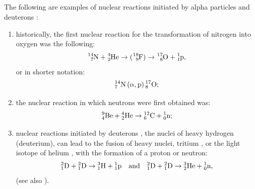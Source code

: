 \subsection{}\label{42.9.6} The following are examples of nuclear reactions initiated by alpha particles and deuterons :
\begin{enumerate}[label = (\alph*)]
\item historically, the first nuclear reaction for the transformation
of nitrogen into oxygen was the following:
\begin{equation*}%
\ce{^{14}_{7}N} + \ce{^{4}_{2}He} \to ( \ce{^{18}_{9}F}) \to \ce{^{17}_{8}O} + \ce{^{1}_{1}p},
\end{equation*}
or in shorter notation:
\begin{equation*}
\nuc{N}{14}{7} \, (\alpha, \textrm{p}) \, \nuc{O}{17}{8};
\end{equation*}
\item the nuclear reaction in which neutrons were first obtained was:
\begin{equation*}%
\nuc{Be}{9}{4} + \nuc{He}{4}{2} \to \nuc{C}{12}{6} + \nuc{n}{1}{0};
\end{equation*}
\item nuclear reactions initiated by deuterons , the nuclei of heavy hydrogen (deuterium), can lead to the fusion of heavy nuclei, tritium , or the light isotope of helium , with the formation of a proton or neutron:
\begin{equation*}%
\nuc{D}{2}{1} + \nuc{D}{2}{1} \to \nuc{H}{3}{1} + \nuc{p}{1}{1} \qand \nuc{D}{2}{1} + \nuc{D}{2}{1} \to \nuc{He}{3}{2} + \nuc{n}{1}{0},
\end{equation*}
(see also ).
\end{enumerate}

